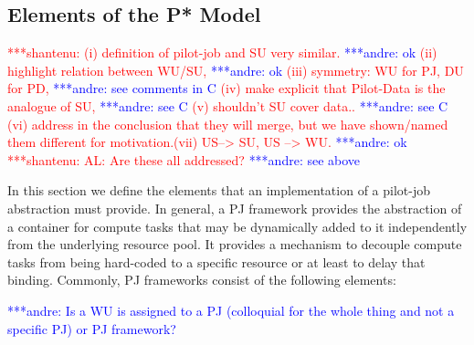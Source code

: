 \documentclass[conference,final]{IEEEtran}
\newcommand{\jhanote}[1]{ {\textcolor{red} { ***shantenu: #1 }}}
\newcommand{\alnote}[1]{ {\textcolor{blue} { ***andre: #1 }}}
\newcommand{\alnote}[1]{}
\newcommand{\jhanote}[1]{}
\newcommand{\upp}{\vspace*{-0.5em}}
\begin{document}



\subsection{Elements of the P* Model \upp\upp}

\jhanote{(i) definition of pilot-job and SU very similar. \alnote{ok} (ii)
highlight relation between WU/SU, \alnote{ok} (iii) symmetry: WU for PJ, DU for
PD, \alnote{see comments in C} (iv) make explicit that Pilot-Data is the
analogue of SU, \alnote{see C} (v) shouldn't SU cover data.. \alnote{see C} (vi)
address in the conclusion that they will merge, but we have shown/named them
different for motivation.(vii) US--> SU, US --> WU.} \alnote{ok} \jhanote{AL:
Are these all addressed?}\alnote{see above}


In this section we define the elements that an implementation of a pilot-job
abstraction must provide. In general, a PJ framework provides the abstraction
of a container for compute tasks that may be dynamically added to it
independently from the underlying resource pool. It provides a mechanism to
decouple compute tasks from being hard-coded to a specific resource or at least
to delay that binding. Commonly, PJ frameworks consist of the following
elements:


\alnote{Is a WU is assigned to a PJ (colloquial for the whole thing
  and not a specific PJ) or PJ framework?}
\end{document}
